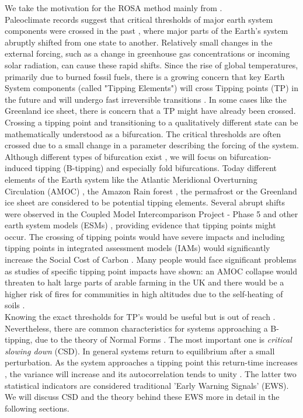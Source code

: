 \documentclass[%
thesis=student,%
coverpage=false,%
titlepage=false,%
headmarks=true, %
english,%
font=libertine, %
math=newpxtx, %
BCOR=5mm,%
coverBCOR=11mm%
]{tumbook}
\begin{document}
We take the motivation for the ROSA method mainly from \cite{Clarke:2023}.\\
Paleoclimate records suggest that critical thresholds of major earth system components were crossed in the past \cite{Brovkin:2021}, where major parts of the Earth's system abruptly shifted from one state to another. Relatively small changes in the external forcing, such as a change in greenhouse gas concentrations or incoming solar radiation, can cause these rapid shifts. Since the rise of global temperatures, primarily due to burned fossil fuels, there is a growing concern \cite{Lenton:2019,Steffen:2018,Ritchie:2021} that key Earth System components (called "Tipping Elements") will cross Tipping points (TP) in the future and will undergo fast irreversible transitions \cite{Lenton:2008}. In some cases like the Greenland ice sheet, there is concern that a TP might have already been crossed.
Crossing a tipping point and transitioning to a qualitatively different state can be mathematically understood as a bifurcation. The critical thresholds are often crossed due to a small change in a parameter describing the forcing of the system. Although different types of bifurcation exist \cite{Ashwin:2012}, we will focus on bifurcation-induced tipping (B-tipping) and especially fold bifurcations. Today different elements of the Earth system like the Atlantic Meridional Overturning Circulation (AMOC) \cite{Stommel:1961}, the Amazon Rain forest \cite{Cox:2000}, the permafrost \cite{Steffen:2018} or the Greenland ice sheet \cite{Feldmann:2015} are considered to be potential tipping elements. Several abrupt shifts were observed in the Coupled Model Intercomparison Project - Phase 5 \cite{Taylor:2012} and other earth system models (ESMs) \cite{Drijfhout:2015}, providing evidence that tipping points might occur. The crossing of tipping points would have severe impacts and including tipping points in integrated assessment models (IAMs) would significantly increase the Social Cost of Carbon \cite{Dietz:2021}. Many people would face significant problems as studies of specific tipping point impacts have shown: an AMOC collapse would threaten to halt large parts of arable farming in the UK \cite{Ritchie:2020} and there would be a higher risk of fires for communities in high altitudes due to the self-heating of soils \cite{Clarke:2021}.    \\
Knowing the exact thresholds for TP's would be useful but is out of reach \cite{Steffen:2018,Drijfhout:2015}. Nevertheless, there are common characteristics for systems approaching a B-tipping, due to the theory of Normal Forms \cite{Strogatz:2015,Guckenheimer:1983}. The most important one is \emph{critical slowing down} (CSD). In general systems return to equilibrium after a small perturbation. As the system approaches a tipping point this return-time increases \cite{Scheffer:2012}, the variance will increase and its autocorrelation tends to unity \cite{Scheffer:2009,Held:2004}. The latter two statistical indicators are considered traditional 'Early Warning Signals' (EWS). We will discuss CSD and the theory behind these EWS more in detail in the following sections. \\
\end{document}

